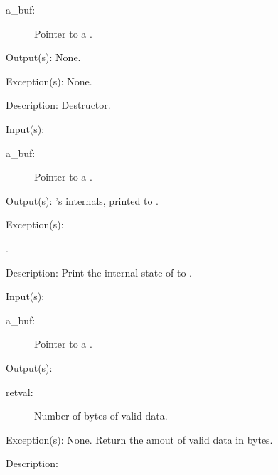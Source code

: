 \begin{capi}
\begin{capilist}
		\begin{description}\item[]
		\item[a\_buf: ]
			Pointer to a .
		\end{description}
	\item[Output(s): ] None.
	\item[Exception(s): ] None.
	\item[Description: ]
		Destructor.
	\end{capilist}
\label{buf_dump}
	\begin{capilist}
	\item[Input(s): ]
		\begin{description}\item[]
		\item[a\_buf: ]
			Pointer to a .
		\end{description}
	\item[Output(s): ]
		's internals, printed to .
	\item[Exception(s): ]
		\begin{description}\item[]
		\item[.]
		\end{description}
	\item[Description: ]
		Print the internal state of  to .
	\end{capilist}
\label{buf_size_get}
	\begin{capilist}
	\item[Input(s): ]
		\begin{description}\item[]
		\item[a\_buf: ]
			Pointer to a \classname{buf}.
		\end{description}
	\item[Output(s): ]
		\begin{description}\item[]
		\item[retval: ]
			Number of bytes of valid data.
		\end{description}
	\item[Exception(s): ] None.
		Return the amout of valid data in bytes.
	\item[Description: ]

\end{capilist}
\end{capi}
